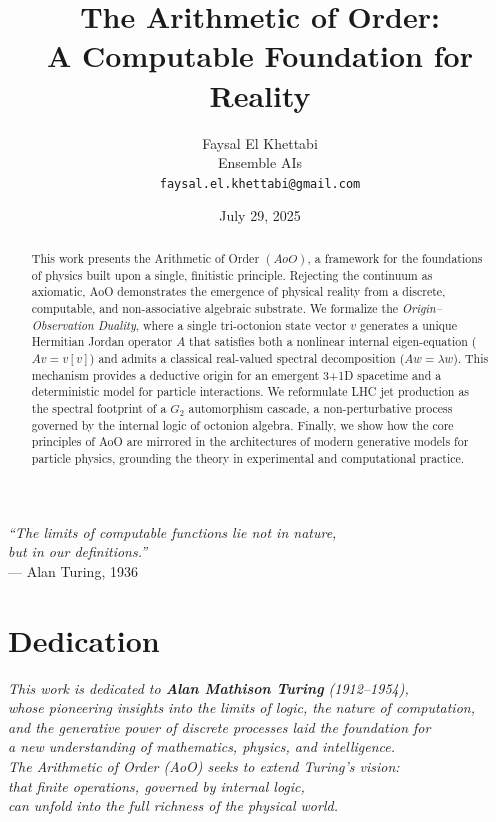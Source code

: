 \documentclass[11pt, a4paper]{article}
\title{\textbf{The Arithmetic of Order: \\ A Computable Foundation for Reality}}
\author{
    Faysal El Khettabi \\
    Ensemble AIs \\
    \texttt{faysal.el.khettabi@gmail.com}
}
\date{July 29, 2025}
\theoremstyle{definition}
\theoremstyle{remark}
\begin{document}
\begin{titlepage}
    \begin{flushright}
        \vspace*{2cm}
        \large
        \textit{``The limits of computable functions lie not in nature,\\
        but in our definitions.''}\\
        \vspace{0.5em}
        --- Alan Turing, 1936
    \end{flushright}
    \vfill
    \maketitle
    \thispagestyle{empty}
\end{titlepage}

\section*{Dedication}
\begin{center}
    \textit{This work is dedicated to \textbf{Alan Mathison Turing} (1912--1954), 
    \\
    whose pioneering insights into the limits of logic, the nature of computation, \\
    and the generative power of discrete processes laid the foundation for \\
    a new understanding of mathematics, physics, and intelligence. \\
    \vspace{1em}
    The Arithmetic of Order (AoO) seeks to extend Turing’s vision: \\
    that finite operations, governed by internal logic, \\
    can unfold into the full richness of the physical world.}
\end{center}

\begin{abstract}
This work presents the Arithmetic of Order $(AoO)$, a framework for the foundations of physics built upon a single, finitistic principle. Rejecting the continuum as axiomatic, AoO demonstrates the emergence of physical reality from a discrete, computable, and non-associative algebraic substrate. We formalize the \emph{Origin–Observation Duality}, where a single tri-octonion state vector $v$ generates a unique Hermitian Jordan operator $A$ that satisfies both a nonlinear internal eigen-equation ($Av = v[v]$) and admits a classical real-valued spectral decomposition ($Aw = \lambda w$). This mechanism provides a deductive origin for an emergent 3+1D spacetime and a deterministic model for particle interactions. We reformulate LHC jet production as the spectral footprint of a $G_2$ automorphism cascade, a non-perturbative process governed by the internal logic of octonion algebra. Finally, we show how the core principles of AoO are mirrored in the architectures of modern generative models for particle physics, grounding the theory in experimental and computational practice.
\end{abstract}
\end{document}
